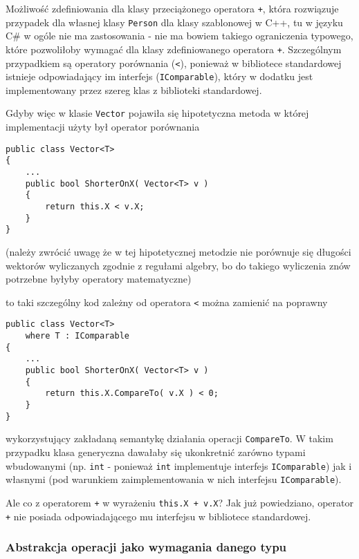 Możliwość zdefiniowania dla klasy przeciążonego operatora {\tt +}, która rozwiązuje przypadek dla własnej klasy 
{\tt Person} dla klasy szablonowej w C++, tu w języku C\# w ogóle nie ma zastosowania - nie ma bowiem takiego
ograniczenia typowego, które pozwoliłoby wymagać dla klasy zdefiniowanego operatora {\tt +}. Szczególnym przypadkiem
są operatory porównania ({\tt <}), ponieważ w bibliotece standardowej istnieje odpowiadający im interfejs ({\tt IComparable}), 
który w dodatku jest implementowany przez szereg klas z biblioteki standardowej.

Gdyby więc w klasie {\tt Vector} pojawiła się hipotetyczna metoda w której implementacji użyty był operator porównania

\begin{scriptsize}
\begin{verbatim}
public class Vector<T>
{
    ...
    public bool ShorterOnX( Vector<T> v )
    {
        return this.X < v.X;
    }    
}
\end{verbatim}
\end{scriptsize}

(należy zwrócić uwagę że w tej hipotetycznej metodzie nie porównuje się długości wektorów wyliczanych
zgodnie z regułami algebry, bo do takiego wyliczenia znów potrzebne byłyby operatory matematyczne)

to taki szczególny kod zależny od operatora {\tt <} można zamienić na poprawny

\begin{scriptsize}
\begin{verbatim}
public class Vector<T>
    where T : IComparable
{
    ...
    public bool ShorterOnX( Vector<T> v )
    {
        return this.X.CompareTo( v.X ) < 0;
    }    
}
\end{verbatim}
\end{scriptsize}

wykorzystujący zakładaną semantykę działania operacji {\tt CompareTo}. W takim przypadku klasa generyczna
dawałaby się ukonkretnić zarówno typami wbudowanymi (np. {\tt int} - ponieważ {\tt int} implementuje interfejs
{\tt IComparable}) jak i własnymi (pod warunkiem zaimplementowania w nich interfejsu {\tt IComparable}).

Ale co z operatorem {\tt +} w wyrażeniu {\tt this.X + v.X}? Jak już powiedziano, operator {\tt +} 
nie posiada odpowiadającego mu interfejsu w bibliotece standardowej.

\subsubsection{Abstrakcja operacji jako wymagania danego typu}

